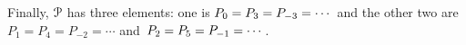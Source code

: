 \documentclass{ibl}  %
\begin{document}
\begin{problem}
\begin{exes}
\begin{answer}
  Finally, $\EuScript{P}$ has three elements: 
  one is $P_0=P_3=P_{-3}=\cdots\hbox{}$ and the other two are
  $P_1=P_4=P_{-2}=\cdots{}$ and~$P_2=P_5=P_{-1}=\cdots\hbox{}$.  
\end{answer}
\end{exes}



  


\end{problem}
\end{document}
